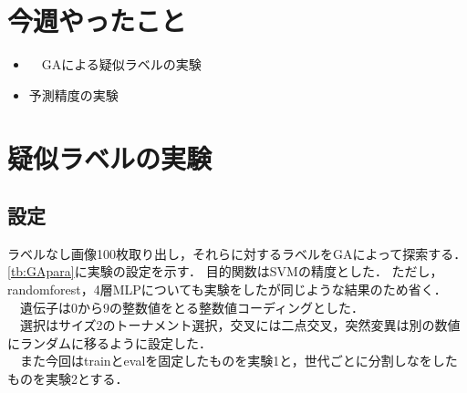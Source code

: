 \documentclass[twocolumn]{jarticle}     %
\begin{document}


\section{今週やったこと}

\begin{itemize}
	\item　GAによる疑似ラベルの実験
	\item 予測精度の実験
\end{itemize}

\section{疑似ラベルの実験}
\subsection{設定}
ラベルなし画像100枚取り出し，それらに対するラベルをGAによって探索する．
\ref{tb:GApara}に実験の設定を示す．
目的関数はSVMの精度とした．
ただし，randomforest，4層MLPについても実験をしたが同じような結果のため省く．\\
　遺伝子は0から9の整数値をとる整数値コーディングとした．\\
　選択はサイズ2のトーナメント選択，交叉には二点交叉，突然変異は別の数値にランダムに移るように設定した．\\
　また今回はtrainとevalを固定したものを実験1と，世代ごとに分割しなをしたものを実験2とする．

\begin{table}[h]
	\centering
	\caption{GAの設定\label{tb:GApara}}
\end{table}
\end{document}
